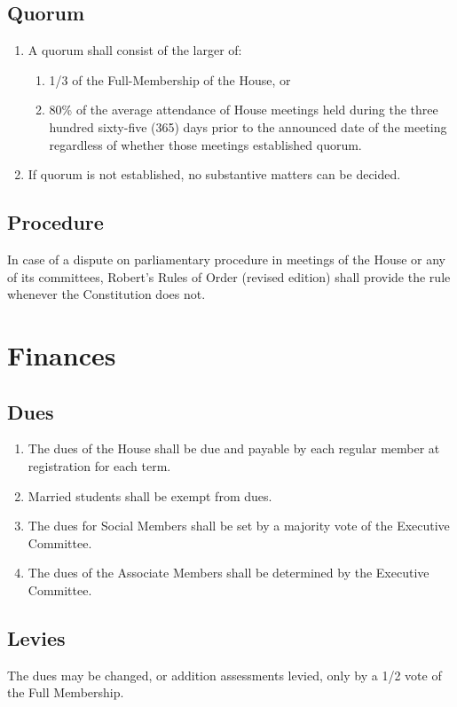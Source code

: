 \documentclass[10pt]{article} %
\begin{document}
\subsection{Quorum}
\begin{enumerate}
\item A quorum shall consist of the larger of:
\begin{enumerate}
\item 1/3 of the Full-Membership of the House, or
\item 80\% of the average attendance of House meetings held during the three hundred sixty-five (365) days prior to the announced date of the meeting regardless of whether those meetings established quorum.
\end{enumerate}
\item If quorum is not established, no substantive matters can be decided.
\end{enumerate}
\subsection{Procedure}
In case of a dispute on parliamentary procedure in meetings of the House or any of its committees, Robert’s Rules of Order (revised edition) shall provide the rule whenever the Constitution does not.
\section{Finances}
\subsection{Dues}
\begin{enumerate}
\item The dues of the House shall be due and payable by each regular member at registration for each term. 
\item Married students shall be exempt from dues.
\item The dues for Social Members shall be set by a majority vote of the Executive Committee.
\item The dues of the Associate Members shall be determined by the Executive Committee.
\end{enumerate}
\subsection{Levies}
The dues may be changed, or addition assessments levied, only by a 1/2 vote of the Full Membership.
\end{document}
